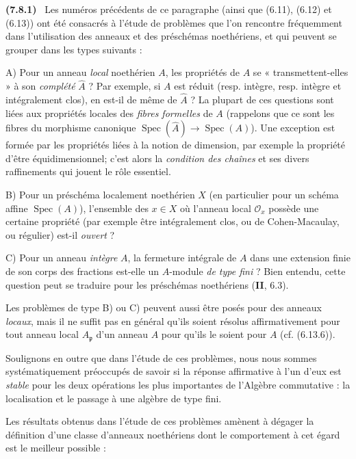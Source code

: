 \documentclass[10pt,oneside]{book}
\newcommand{\oldpage}[2][]{%
  \setcounter{footnote}{0}%
  \marginpar{\scriptsize\textbf{#1}~|~#2}\ignorespaces}
\newenvironment{env}[1][]{\par\medskip\noindent\textbf{(#1)}\ }{\par}
\begin{document}
\begin{env}[7.8.1]
\label{IV.2.s7.8.1-fr}
Les numéros précédents de ce paragraphe (ainsi que (6.11), (6.12) et (6.13))
ont été consacrés à l'étude de problèmes que l'on rencontre fréquemment dans
l'utilisation des anneaux et des préschémas noethériens, et qui peuvent se
grouper dans les types suivants :

\oldpage[IV-2]{214}

A) Pour un anneau \emph{local} noethérien $A$, les propriétés de $A$ se
« transmettent-elles » à son \emph{complété} $\widehat A$ ? Par exemple, si
$A$ est réduit (resp. intègre, resp. intègre et intégralement clos), en est-il
de même de $\widehat A$ ? La plupart de ces questions sont liées aux propriétés
locales des \emph{fibres formelles} de $A$ (rappelons que ce sont les fibres du
morphisme canonique
$\operatorname{Spec}(\widehat A)\to\operatorname{Spec}(A)$). Une exception est
formée par les propriétés liées à la notion de dimension, par exemple la
propriété d'être équidimensionnel; c'est alors la \emph{condition des chaînes}
et ses divers raffinements qui jouent le rôle essentiel.

B) Pour un préschéma localement noethérien $X$ (en particulier pour un schéma
affine $\operatorname{Spec}(A)$), l'ensemble des $x\in X$ où l'anneau local
$\mathcal O_x$ possède une certaine propriété (par exemple être intégralement
clos, ou de Cohen-Macaulay, ou régulier) est-il \emph{ouvert} ?

C) Pour un anneau \emph{intègre} $A$, la fermeture intégrale de $A$ dans une
extension finie de son corps des fractions est-elle un $A$-module \emph{de type
fini} ? Bien entendu, cette question peut se traduire pour les préschémas
noethériens (\textbf{II}, 6.3).

Les problèmes de type B) ou C) peuvent aussi être posés pour des anneaux
\emph{locaux}, mais il ne suffit pas en général qu'ils soient résolus
affirmativement pour tout anneau local $A_{\mathfrak p}$ d'un anneau $A$ pour
qu'ils le soient pour $A$ (cf. (6.13.6)).

Soulignons en outre que dans l'étude de ces problèmes, nous nous sommes
systématiquement préoccupés de savoir si la réponse affirmative à l'un d'eux
est \emph{stable} pour les deux opérations les plus importantes de l'Algèbre
commutative : la localisation et le passage à une algèbre de type fini.

Les résultats obtenus dans l'étude de ces problèmes amènent à dégager la
définition d'une classe d'anneaux noethériens dont le comportement à cet égard
est le meilleur possible :
\end{env}
\end{document}
